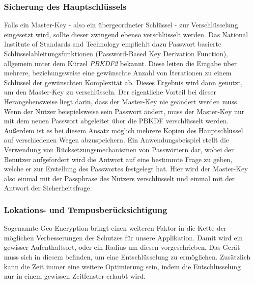 		\subsubsection{Sicherung des Hauptschlüssels}\label{sec:master-key}		
			Falls ein Master-Key - also ein übergeordneter Schlüssel - zur
			Verschlüsselung eingesetzt wird, sollte dieser zwingend ebenso verschlüsselt
			werden. Das National Institute of Standards and Technology
			empfiehlt\cite{NISTPBKDF2010} dazu Passwort basierte 
			Schlüsselableitungsfunktionen (Password-Based Key Derivation Function),
			allgemein unter dem Kürzel \textsl{PBKDF2} bekannt.
			Diese leiten die Eingabe über mehrere, beziehungsweise eine gewünschte Anzahl
			von Iterationen zu einem Schlüssel der gewünschten Komplexität ab. Dieses
			Ergebnis wird dann genutzt, um den Master-Key zu verschlüsseln. Der
			eigentliche Vorteil bei dieser Herangehensweise liegt darin, dass der
			Master-Key nie geändert werden muss. Wenn der Nutzer beispielsweise sein
			Passwort ändert, muss der Master-Key nur mit dem neuen Passwort abgeleitet
			über die PBKDF verschlüsselt werden. Außerdem ist es bei diesem Ansatz
			möglich mehrere Kopien des Hauptschlüssel auf verschiedenen Wegen
			abzuspeichern. Ein Anwendungsbeispiel stellt die
			Verwendung von Rücksetzungsmechanismen von Passwörtern dar, wobei der
			Benutzer aufgefordert wird die Antwort auf eine bestimmte Frage zu geben,
			welche er zur Erstellung des Passwortes festgelegt hat. Hier wird der
			Master-Key also einmal mit der Passphrase des Nutzers verschlüsselt und
			einmal mit der Antwort der Sicherheitsfrage.
		\subsubsection{Lokations- und Tempusberücksichtigung}
			Sogenannte Geo-Encryption bringt einen weiteren Faktor in die Kette der
			möglichen Verbesserungen des Schutzes für unsere Applikation. Damit wird
			ein gewisser Aufenthaltsort, oder ein Radius um diesen vorgeschrieben. Das
			Gerät muss sich in diesem befinden, um eine Entschlüsselung zu ermöglichen.
			Zusätzlich kann die Zeit immer eine weitere Optimierung sein, indem die
			Entschlüsselung nur in einem gewissen Zeitfenster erlaubt wird.
